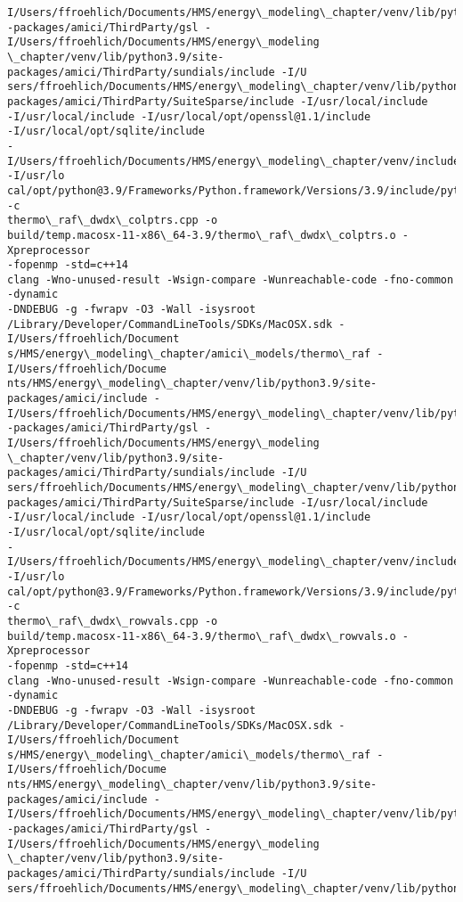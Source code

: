 \documentclass[11pt]{article}
\begin{document}
\begin{Verbatim}[commandchars=\\\{\}]
I/Users/ffroehlich/Documents/HMS/energy\_modeling\_chapter/venv/lib/python3.9/site
-packages/amici/ThirdParty/gsl -I/Users/ffroehlich/Documents/HMS/energy\_modeling
\_chapter/venv/lib/python3.9/site-packages/amici/ThirdParty/sundials/include -I/U
sers/ffroehlich/Documents/HMS/energy\_modeling\_chapter/venv/lib/python3.9/site-
packages/amici/ThirdParty/SuiteSparse/include -I/usr/local/include
-I/usr/local/include -I/usr/local/opt/openssl@1.1/include
-I/usr/local/opt/sqlite/include
-I/Users/ffroehlich/Documents/HMS/energy\_modeling\_chapter/venv/include -I/usr/lo
cal/opt/python@3.9/Frameworks/Python.framework/Versions/3.9/include/python3.9 -c
thermo\_raf\_dwdx\_colptrs.cpp -o
build/temp.macosx-11-x86\_64-3.9/thermo\_raf\_dwdx\_colptrs.o -Xpreprocessor
-fopenmp -std=c++14
clang -Wno-unused-result -Wsign-compare -Wunreachable-code -fno-common -dynamic
-DNDEBUG -g -fwrapv -O3 -Wall -isysroot
/Library/Developer/CommandLineTools/SDKs/MacOSX.sdk -I/Users/ffroehlich/Document
s/HMS/energy\_modeling\_chapter/amici\_models/thermo\_raf -I/Users/ffroehlich/Docume
nts/HMS/energy\_modeling\_chapter/venv/lib/python3.9/site-packages/amici/include -
I/Users/ffroehlich/Documents/HMS/energy\_modeling\_chapter/venv/lib/python3.9/site
-packages/amici/ThirdParty/gsl -I/Users/ffroehlich/Documents/HMS/energy\_modeling
\_chapter/venv/lib/python3.9/site-packages/amici/ThirdParty/sundials/include -I/U
sers/ffroehlich/Documents/HMS/energy\_modeling\_chapter/venv/lib/python3.9/site-
packages/amici/ThirdParty/SuiteSparse/include -I/usr/local/include
-I/usr/local/include -I/usr/local/opt/openssl@1.1/include
-I/usr/local/opt/sqlite/include
-I/Users/ffroehlich/Documents/HMS/energy\_modeling\_chapter/venv/include -I/usr/lo
cal/opt/python@3.9/Frameworks/Python.framework/Versions/3.9/include/python3.9 -c
thermo\_raf\_dwdx\_rowvals.cpp -o
build/temp.macosx-11-x86\_64-3.9/thermo\_raf\_dwdx\_rowvals.o -Xpreprocessor
-fopenmp -std=c++14
clang -Wno-unused-result -Wsign-compare -Wunreachable-code -fno-common -dynamic
-DNDEBUG -g -fwrapv -O3 -Wall -isysroot
/Library/Developer/CommandLineTools/SDKs/MacOSX.sdk -I/Users/ffroehlich/Document
s/HMS/energy\_modeling\_chapter/amici\_models/thermo\_raf -I/Users/ffroehlich/Docume
nts/HMS/energy\_modeling\_chapter/venv/lib/python3.9/site-packages/amici/include -
I/Users/ffroehlich/Documents/HMS/energy\_modeling\_chapter/venv/lib/python3.9/site
-packages/amici/ThirdParty/gsl -I/Users/ffroehlich/Documents/HMS/energy\_modeling
\_chapter/venv/lib/python3.9/site-packages/amici/ThirdParty/sundials/include -I/U
sers/ffroehlich/Documents/HMS/energy\_modeling\_chapter/venv/lib/python3.9/site-

\end{Verbatim}
\end{document}
